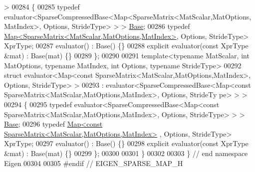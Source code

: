 \begin{DoxyCode}
      >
00284 \{
00285   \textcolor{keyword}{typedef} evaluator<SparseCompressedBase<Map<SparseMatrix<MatScalar,MatOptions,MatIndex>, Options, 
      StrideType> > > \hyperlink{class_eigen_1_1_sparse_map_base}{Base};
00286   \textcolor{keyword}{typedef} \hyperlink{group___core___module_class_eigen_1_1_map}{Map<SparseMatrix<MatScalar,MatOptions,MatIndex>}, 
      Options, StrideType> XprType;  
00287   evaluator() : Base() \{\}
00288   \textcolor{keyword}{explicit} evaluator(\textcolor{keyword}{const} XprType &mat) : Base(mat) \{\}
00289 \};
00290 
00291 \textcolor{keyword}{template}<\textcolor{keyword}{typename} MatScalar, \textcolor{keywordtype}{int} MatOptions, \textcolor{keyword}{typename} MatIndex, \textcolor{keywordtype}{int} Options, \textcolor{keyword}{typename} Str\textcolor{keywordtype}{id}eType>
00292 \textcolor{keyword}{struct }evaluator<Map<const SparseMatrix<MatScalar,MatOptions,MatIndex>, Options, StrideType> >
00293   : evaluator<SparseCompressedBase<Map<const SparseMatrix<MatScalar,MatOptions,MatIndex>, Options, StrideTy
      pe> > >
00294 \{
00295   \textcolor{keyword}{typedef} evaluator<SparseCompressedBase<Map<const SparseMatrix<MatScalar,MatOptions,MatIndex>, Options, 
      StrideType> > > \hyperlink{class_eigen_1_1_sparse_map_base}{Base};
00296   \textcolor{keyword}{typedef} \hyperlink{group___core___module_class_eigen_1_1_map}{Map<const SparseMatrix<MatScalar,MatOptions,MatIndex>}
      , Options, StrideType> XprType;  
00297   evaluator() : Base() \{\}
00298   \textcolor{keyword}{explicit} evaluator(\textcolor{keyword}{const} XprType &mat) : Base(mat) \{\}
00299 \};
00300 
00301 \}
00302 
00303 \} \textcolor{comment}{// end namespace Eigen}
00304 
00305 \textcolor{preprocessor}{#endif // EIGEN\_SPARSE\_MAP\_H}
\end{DoxyCode}
